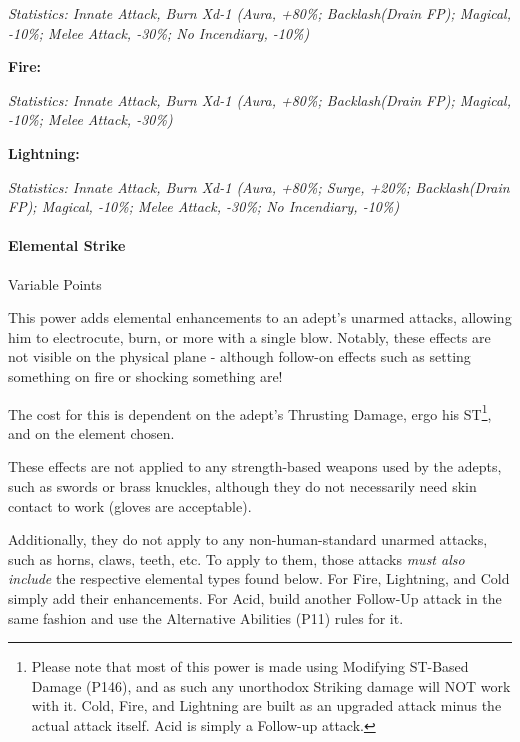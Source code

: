 \begin{multicols*}{3}
	\textcolor{OliveGreen}{\textit{Statistics: Innate Attack, Burn Xd-1 (Aura, +80\%; Backlash(Drain FP); Magical, -10\%; Melee Attack, -30\%; No Incendiary, -10\%) }}
	
	\textbf{Fire:}
	
	\textcolor{OliveGreen}{\textit{Statistics: Innate Attack, Burn Xd-1 (Aura, +80\%; Backlash(Drain FP); Magical, -10\%; Melee Attack, -30\%) }}
	
	\textbf{Lightning:}
	
	\textcolor{OliveGreen}{\textit{Statistics: Innate Attack, Burn Xd-1 (Aura, +80\%; Surge, +20\%; Backlash(Drain FP); Magical, -10\%; Melee Attack, -30\%; No Incendiary, -10\%) }}

	\paragraph{Elemental Strike}
	\begin{flushright}
		Variable Points
	\end{flushright}

	This power adds elemental enhancements to an adept's unarmed attacks, allowing him to electrocute, burn, or more with a single blow. Notably, these effects are not visible on the physical plane - although follow-on effects such as setting something on fire or shocking something are!
	
	The cost for this is dependent on the adept's Thrusting Damage, ergo his ST\footnote{Please note that most of this power is made using Modifying ST-Based Damage (P146), and as such any unorthodox Striking damage will NOT work with it. Cold, Fire, and Lightning are built as an upgraded attack minus the actual attack itself. Acid is simply a Follow-up attack.}, and on the element chosen.
	
	These effects are not applied to any strength-based weapons used by the adepts, such as swords or brass knuckles, although they do not necessarily need skin contact to work (gloves are acceptable).
	
	Additionally, they do not apply to any non-human-standard unarmed attacks, such as horns, claws, teeth, etc. To apply to them, those attacks \textit{must also include} the respective elemental types found below. For Fire, Lightning, and Cold simply add their enhancements. For Acid, build another Follow-Up attack in the same fashion and use the Alternative Abilities (P11) rules for it.
	

\end{multicols*}
